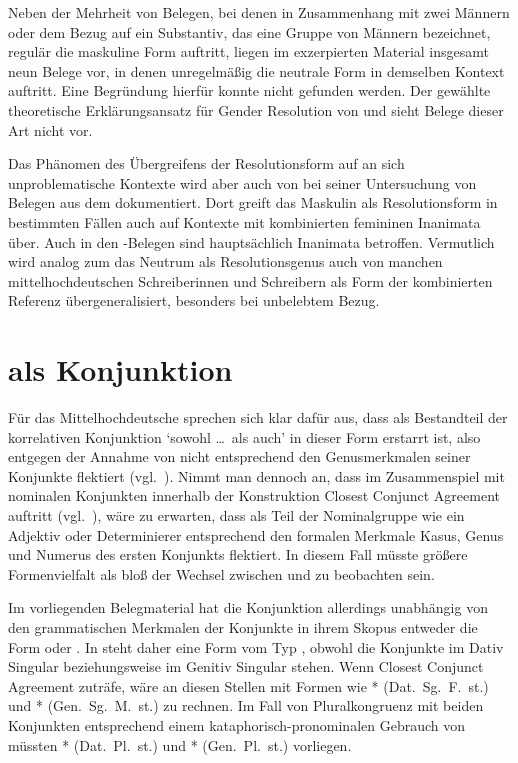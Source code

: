 Neben der Mehrheit von Belegen, bei denen in Zusammenhang mit zwei Männern oder
dem Bezug auf ein Substantiv, das eine Gruppe von Männern bezeichnet, regulär
die maskuline Form  auftritt, liegen im exzerpierten Material
insgesamt neun Belege vor, in denen unregelmäßig die neutrale Form
 in demselben Kontext auftritt. Eine Begründung hierfür konnte
nicht gefunden werden. Der gewählte theoretische Erklärungsansatz für Gender
Resolution von \citet{wechslerzlatic2003} und \citet{wechsler2009} sieht Belege
dieser Art nicht vor.

Das Phänomen des Übergreifens der Resolutionsform auf an sich unproblematische
Kontexte wird aber auch von \citet[302]{corbett1991} bei seiner Untersuchung
von Belegen aus dem  dokumentiert. Dort greift das Maskulin als
Resolutionsform in bestimmten Fällen auch auf Kon\-texte mit kombinierten
femininen Inanimata über. Auch in den \CAO{}-Belegen sind hauptsächlich
Inanimata betroffen. Vermutlich wird analog zum  das Neutrum als
Resolutionsgenus auch von manchen mittelhochdeutschen
Schreiberinnen und Schreibern als Form der kombinierten Referenz
übergeneralisiert, besonders bei unbelebtem Bezug.


\section{ als Konjunktion}
\label{sec:beideconj}

Für das Mittelhochdeutsche sprechen sich
\citet[626--627]{ksw2} klar dafür aus, dass  als Bestandteil der
korrelativen Konjunktion  `sowohl \dots\ als auch' in
dieser Form erstarrt ist, also  entgegen der Annahme von
\citet{askedal1974} nicht entsprechend den Genusmerkmalen seiner Konjunkte
flektiert (vgl.~). Nimmt man dennoch an, dass im
Zusammenspiel mit nominalen Konjunkten innerhalb der Konstruktion Closest
Conjunct Agreement auftritt (vgl.~), wäre zu erwarten,
dass  als Teil der Nominalgruppe wie ein Adjektiv oder
Determinierer entsprechend den formalen Merkmale Kasus, Genus und Numerus des
ersten Konjunkts flektiert. In diesem Fall müsste größere Formenvielfalt als
bloß der Wechsel zwischen  und  zu beobachten sein.

Im vorliegenden Belegmaterial hat die Konjunktion allerdings unabhängig von den
grammatischen Merkmalen der Konjunkte in ihrem Skopus entweder die Form
 oder . In  steht daher eine
Form vom Typ , obwohl die Konjunkte im Dativ Singular
 beziehungsweise im Genitiv Singular
 stehen. Wenn Closest Conjunct Agreement zuträfe, wäre
an diesen Stellen mit Formen wie * (Dat.~Sg.~F.~st.) und
* (Gen.~Sg.~M.~st.) zu rechnen. Im Fall von Pluralkongruenz mit
beiden Konjunkten entsprechend einem kataphorisch-pronominalen Gebrauch von
 müssten * (Dat.\ Pl.\ st.) und *
(Gen.\ Pl.\ st.) vorliegen.

